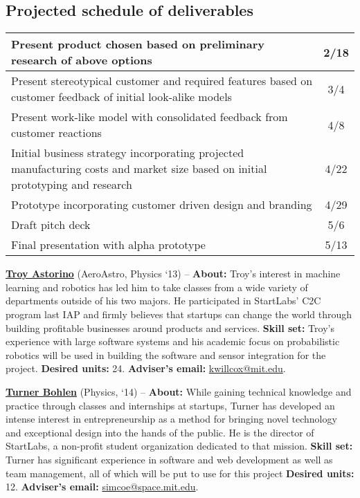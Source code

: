 \documentclass[8pt]{article}
\begin{document}
\subsection*{Projected schedule of deliverables}

\begin{tabular}{>{\RaggedLeft}p{6in} | c}
Present product chosen based on preliminary research of above options & 2/18 \\ \hline
Present stereotypical customer and required features based on customer feedback of initial look-alike models & 3/4 \\ \hline
Present work-like model with consolidated feedback from customer reactions & 4/8 \\ \hline
Initial business strategy incorporating projected manufacturing costs and market
size based on initial prototyping and research& 4/22 \\ \hline
Prototype incorporating customer driven design and branding & 4/29 \\ \hline
Draft pitch deck & 5/6 \\ \hline
Final presentation with alpha prototype & 5/13 \\ 

\end{tabular}

\vspace{.55cm}
\hline
\vspace{.1cm}
\hline
\vspace{.35cm}

\noindent \textbf{\href{http://www.troyastorino.com}{Troy Astorino}} (AeroAstro,
Physics `13) -- \textbf{About:} Troy's interest in machine learning and robotics
has led him to take classes from a wide variety of departments outside of his
two majors. He participated in StartLabs' C2C program last IAP and firmly
believes that startups can change the world through building profitable
businesses around products and services. \textbf{Skill set:} Troy's experience
with large software systems and his academic focus on probabilistic robotics
will be used in building the software and sensor integration for the project.
\textbf{Desired units:} 24. \textbf{Adviser's email:}
\href{mailto:kwillcox@mit.edu}{kwillcox@mit.edu}.

\vspace{.25cm}

\noindent \textbf{\href{http://www.turnerbohlen.com}{Turner Bohlen}} (Physics,
`14) -- \textbf{About:} While gaining technical knowledge and practice through
classes and internships at startups, Turner has developed an intense interest in
entrepreneurship as a method for bringing novel technology and exceptional
design into the hands of the public. He is the director of StartLabs, a
non-profit student organization dedicated to that mission. \textbf{Skill set:}
Turner has significant experience in software and web development as well as
team management, all of which will be put to use for this project \textbf{Desired units:} 12.
\textbf{Adviser's email:}
\href{mailto:simcoe@space.mit.edu}{simcoe@space.mit.edu}.
\end{document}

